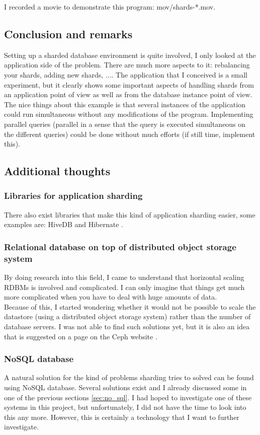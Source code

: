 \documentclass[12pt]{report}
\begin{document}
I recorded a movie to demonstrate this program: mov/shards-*.mov.

\subsection{Conclusion and remarks}
Setting up a sharded database environment is quite involved, I only
looked at the application side of the problem. There are much more
aspects to it: rebalancing your shards, adding new shards, ....
The application that I conceived is a small experiment, but it clearly
shows some important aspects of handling shards from an application
point of view as well as from the database instance point of view.
The nice things about this example is that several instances of the
application could run simultaneous without any modifications of the
program.
Implementing parallel queries (parallel in a sense that the query is
executed simultaneous on the different queries) could be done without
much efforts (if still time, implement this).

\subsection{Additional thoughts}
\subsubsection{Libraries for application sharding}
There also exist libraries that make this kind
of application sharding easier, some examples are: HiveDB
\cite{hivedb} and Hibernate \cite{hibernate_tenants}.

\subsubsection{Relational database on top of distributed object
  storage system} 
By doing research into this field, I came to understand that
horizontal scaling RDBMs is involved and complicated. I can only
imagine that things get much more complicated when you have to deal
with huge amounts of data.\\
Because of this, I started wondering whether it would not be possible
to scale the datastore (using a distributed object storage system)
rather than the number of database servers. 
I was not able to find such solutions yet, but it is also an idea that
is suggested on a page on the Ceph website
\cite{ceph_more_than_an_object_store}.

\subsubsection{NoSQL database}
A natural solution for the kind of problems sharding tries to solved
can be found using NoSQL database. Several solutions exist and I
already discussed some in one of the previous sections
\ref{sec:no_sql}.
I had hoped to investigate one of these systems in this project, but
unfortunately, I did not have the time to look into this any
more. However, this is certainly a technology that I want to further
investigate. 
\end{document}
